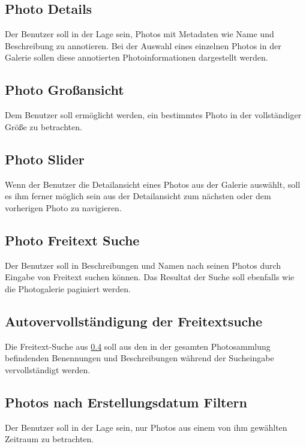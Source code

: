 \subsection{Photo Details}

Der Benutzer soll in der Lage sein, Photos mit Metadaten wie Name und Beschreibung zu annotieren. Bei der Auswahl eines einzelnen Photos in der Galerie sollen diese annotierten Photoinformationen dargestellt werden.

\subsection{Photo Großansicht}

Dem Benutzer soll ermöglicht werden, ein bestimmtes Photo in der vollständiger Größe zu betrachten.

\subsection{Photo Slider}

Wenn der Benutzer die Detailansicht eines Photos aus der Galerie auswählt, soll es ihm ferner möglich sein aus der Detailansicht zum nächsten oder dem vorherigen Photo zu navigieren.

\subsection{Photo Freitext Suche}
\label{ssec:photo_freitext_suche}

Der Benutzer soll in Beschreibungen und Namen nach seinen Photos durch Eingabe von Freitext suchen können. Das Resultat der Suche soll ebenfalls wie die Photogalerie paginiert werden.

\subsection{Autovervollständigung der Freitextsuche}

Die Freitext-Suche aus \ref{ssec:photo_freitext_suche} soll aus den in der gesamten Photosammlung befindenden Benennungen und Beschreibungen während der
Sucheingabe vervollständigt werden.

\subsection{Photos nach Erstellungsdatum Filtern}

Der Benutzer soll in der Lage sein, nur Photos aus einem von ihm gewählten Zeitraum zu betrachten.


